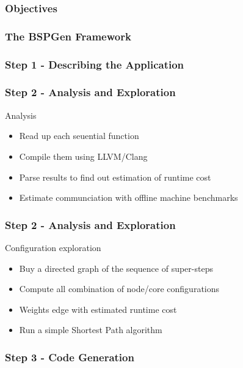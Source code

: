 \frame
{
  \frametitle{Objectives}
}

\frame
{
  \frametitle{The BSPGen Framework}
\begin{center}\end{center}
}

\frame
{
  \frametitle{Step 1 - Describing the Application}
}

\frame
{
  \frametitle{Step 2 - Analysis and Exploration}
  \begin{block}{Analysis}
  \begin{itemize}
   \footnotesize
   \item Read up each seuential function
   \item Compile them using LLVM/Clang
   \item Parse results to find out estimation of runtime cost
   \item Estimate communciation with offline machine benchmarks
  \end{itemize}
  \end{block}{}
}
\frame
{
  \frametitle{Step 2 - Analysis and Exploration}
  \begin{block}{Configuration exploration}
  \begin{itemize}
   \footnotesize
   \item Buy a directed graph of the sequence of super-steps
   \item Compute all combination of node/core configurations
   \item Weights edge with estimated runtime cost 
   \item Run a simple Shortest Path algorithm
  \end{itemize}
  \end{block}{}

}

\frame
{
  \frametitle{Step 3 - Code Generation}
}

